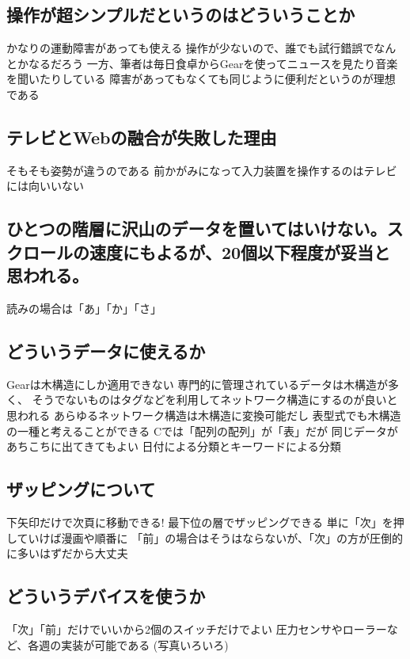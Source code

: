 \documentclass[twoside]{wiss}
\def\GEAR{\textsf{Gear}}
\begin{document}
\subsection{操作が超シンプルだというのはどういうことか}

  かなりの運動障害があっても使える
  操作が少ないので、誰でも試行錯誤でなんとかなるだろう
  一方、筆者は毎日食卓から{\GEAR}を使ってニュースを見たり音楽を聞いたりしている
  障害があってもなくても同じように便利だというのが理想である

\subsection{テレビとWebの融合が失敗した理由}
   そもそも姿勢が違うのである
   前かがみになって入力装置を操作するのはテレビには向いいない

\subsection{ひとつの階層に沢山のデータを置いてはいけない。スクロールの速度にもよるが、20個以下程度が妥当と思われる。}
   読みの場合は「あ」「か」「さ」

\subsection{どういうデータに使えるか}
   {\GEAR}は木構造にしか適用できない
   専門的に管理されているデータは木構造が多く、
   そうでないものはタグなどを利用してネットワーク構造にするのが良いと思われる
   あらゆるネットワーク構造は木構造に変換可能だし
     表型式でも木構造の一種と考えることができる
     Cでは「配列の配列」が「表」だが
   同じデータがあちこちに出てきてもよい
     日付による分類とキーワードによる分類

\subsection{ザッピングについて}
   下矢印だけで次頁に移動できる!
   最下位の層でザッピングできる
   単に「次」を押していけば漫画や順番に
   「前」の場合はそうはならないが、「次」の方が圧倒的に多いはずだから大丈夫

\subsection{どういうデバイスを使うか}

  「次」「前」だけでいいから2個のスイッチだけでよい
   圧力センサやローラーなど、各週の実装が可能である
   (写真いろいろ)
\end{document}
